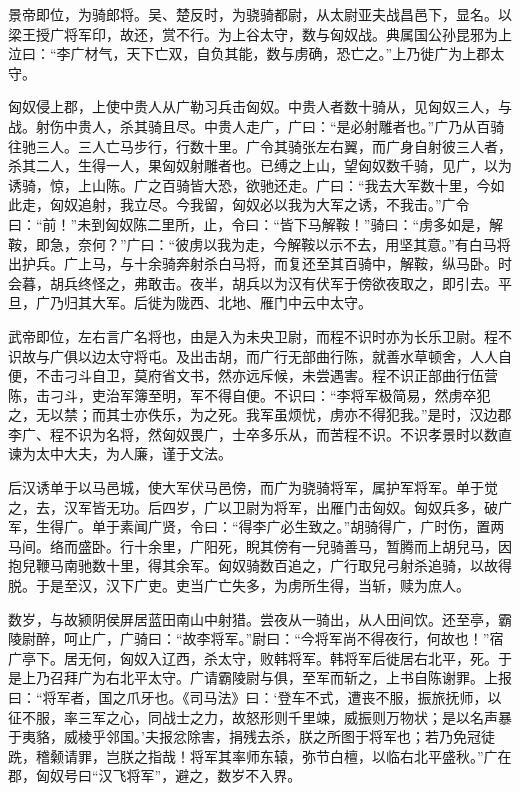 \documentclass[12pt,UTF8]{ctexbook}
\begin{document}
景帝即位，为骑郎将。吴、楚反时，为骁骑都尉，从太尉亚夫战昌邑下，显名。以梁王授广将军印，故还，赏不行。为上谷太守，数与匈奴战。典属国公孙昆邪为上泣曰：“李广材气，天下亡双，自负其能，数与虏确，恐亡之。”上乃徙广为上郡太守。



匈奴侵上郡，上使中贵人从广勒习兵击匈奴。中贵人者数十骑从，见匈奴三人，与战。射伤中贵人，杀其骑且尽。中贵人走广，广曰：“是必射雕者也。”广乃从百骑往驰三人。三人亡马步行，行数十里。广令其骑张左右翼，而广身自射彼三人者，杀其二人，生得一人，果匈奴射雕者也。已缚之上山，望匈奴数千骑，见广，以为诱骑，惊，上山陈。广之百骑皆大恐，欲驰还走。广曰：“我去大军数十里，今如此走，匈奴追射，我立尽。今我留，匈奴必以我为大军之诱，不我击。”广令曰：“前！”未到匈奴陈二里所，止，令曰：“皆下马解鞍！”骑曰：“虏多如是，解鞍，即急，奈何？”广曰：“彼虏以我为走，今解鞍以示不去，用坚其意。”有白马将出护兵。广上马，与十余骑奔射杀白马将，而复还至其百骑中，解鞍，纵马卧。时会暮，胡兵终怪之，弗敢击。夜半，胡兵以为汉有伏军于傍欲夜取之，即引去。平旦，广乃归其大军。后徙为陇西、北地、雁门中云中太守。



武帝即位，左右言广名将也，由是入为未央卫尉，而程不识时亦为长乐卫尉。程不识故与广俱以边太守将屯。及出击胡，而广行无部曲行陈，就善水草顿舍，人人自便，不击刁斗自卫，莫府省文书，然亦远斥候，未尝遇害。程不识正部曲行伍营陈，击刁斗，吏治军簿至明，军不得自便。不识曰：“李将军极简易，然虏卒犯之，无以禁；而其士亦佚乐，为之死。我军虽烦忧，虏亦不得犯我。”是时，汉边郡李广、程不识为名将，然匈奴畏广，士卒多乐从，而苦程不识。不识孝景时以数直谏为太中大夫，为人廉，谨于文法。



后汉诱单于以马邑城，使大军伏马邑傍，而广为骁骑将军，属护军将军。单于觉之，去，汉军皆无功。后四岁，广以卫尉为将军，出雁门击匈奴。匈奴兵多，破广军，生得广。单于素闻广贤，令曰：“得李广必生致之。”胡骑得广，广时伤，置两马间。络而盛卧。行十余里，广阳死，睨其傍有一兒骑善马，暂腾而上胡兒马，因抱兒鞭马南驰数十里，得其余军。匈奴骑数百追之，广行取兒弓射杀追骑，以故得脱。于是至汉，汉下广吏。吏当广亡失多，为虏所生得，当斩，赎为庶人。



数岁，与故颍阴侯屏居蓝田南山中射猎。尝夜从一骑出，从人田间饮。还至亭，霸陵尉醉，呵止广，广骑曰：“故李将军。”尉曰：“今将军尚不得夜行，何故也！”宿广亭下。居无何，匈奴入辽西，杀太守，败韩将军。韩将军后徙居右北平，死。于是上乃召拜广为右北平太守。广请霸陵尉与俱，至军而斩之，上书自陈谢罪。上报曰：“将军者，国之爪牙也。《司马法》曰：‘登车不式，遭丧不服，振旅抚师，以征不服，率三军之心，同战士之力，故怒形则千里竦，威振则万物状；是以名声暴于夷貉，威棱乎邻国。’夫报忿除害，捐残去杀，朕之所图于将军也；若乃免冠徒跣，稽颡请罪，岂朕之指哉！将军其率师东辕，弥节白檀，以临右北平盛秋。”广在郡，匈奴号曰“汉飞将军”，避之，数岁不入界。
\end{document}
